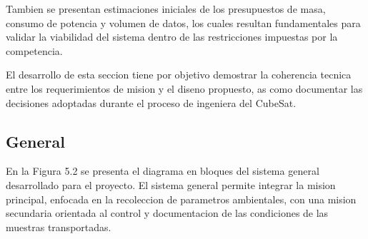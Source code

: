 Tambien se presentan estimaciones iniciales de los presupuestos de masa, consumo de
potencia y volumen de datos, los cuales resultan fundamentales para validar la viabilidad del
sistema dentro de las restricciones impuestas por la competencia.

El desarrollo de esta seccion tiene por objetivo demostrar la coherencia tecnica entre los
requerimientos de mision y el diseno propuesto, as como documentar las decisiones adoptadas
durante el proceso de ingeniera del CubeSat.

  \subsection{General}
    En la Figura 5.2 se presenta el diagrama en bloques del sistema general desarrollado para
    el proyecto.
    El sistema general permite integrar la mision principal, enfocada en la recoleccion de
    parametros ambientales, con una mision secundaria orientada al control y documentacion de
    las condiciones de las muestras transportadas.

